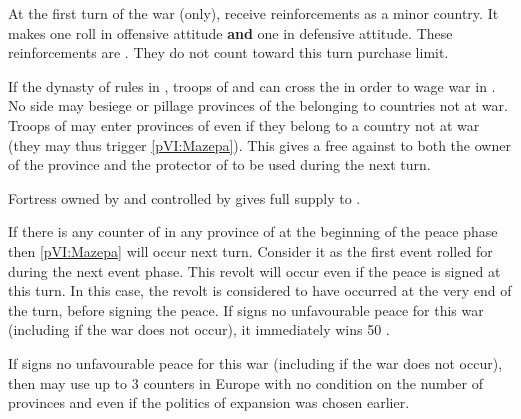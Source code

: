 
\phadm
\aparag At the first turn of the war (only), \SUE receive reinforcements as a
minor country. It makes one roll in offensive attitude \textbf{and} one in
defensive attitude.
\bparag These reinforcements are \Veteran. They do not count toward this turn
purchase limit.

\phmil
\aparag If the dynasty of \payssaxe rules in \POL, troops of \POL and \SUE can
cross the \HRE in order to wage war in \payssaxe.
\bparag No side may besiege or pillage provinces of the \HRE belonging to
countries not at war.
\aparag Troops of \SUE may enter provinces of \regionUkraine even if they
belong to a country not at war (they may thus trigger \ref{pVI:Mazepa}).
\bparag This gives a free \CB against \SUE to both the owner of the province
and the protector of \paysukraine to be used during the next turn.

\aparag Fortress owned by \POL and controlled by \SUE gives full supply to
\SUE.

\phpaix
{} If there is any \ARMY counter of \SUE
in any province of \regionUkraine at the beginning of the peace phase then
\ref{pVI:Mazepa} will occur next turn. Consider it as the first event rolled
for during the next event phase.
\bparag This revolt will occur even if the peace is signed at this turn. In
this case, the revolt is considered to have occurred at the very end of the
turn, before signing the peace.
\aparag If \SUE signs no unfavourable peace for this war (including if the war
does not occur), it immediately wins 50 \VP.

\effetlong
\aparag If \SUE signs no unfavourable peace for this war (including if the war
does not occur), then \SUE may use up to 3 \ARMY counters in Europe with no
condition on the number of provinces and even if the politics of \ROTW
expansion was chosen earlier.

